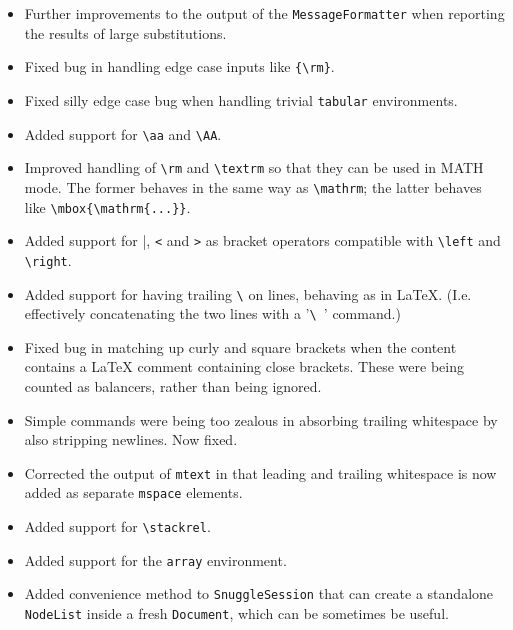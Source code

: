 \begin{itemize}

  \item Further improvements to the output of the \verb|MessageFormatter| when
  reporting the results of large substitutions.

  \item Fixed bug in handling edge case inputs like \verb|{\rm}|.

  \item Fixed silly edge case bug when handling trivial \verb|tabular|
  environments.

  \item Added support for \verb|\aa| and \verb|\AA|.

  \item Improved handling of \verb|\rm| and \verb|\textrm| so that they can be
  used in MATH mode. The former behaves in the same way as \verb|\mathrm|; the
  latter behaves like \verb|\mbox{\mathrm{...}}|.

  \item Added support for \verb|||, \verb|<| and \verb|>| as bracket operators
  compatible with \verb|\left| and \verb|\right|.

  \item Added support for having trailing \verb|\| on lines, behaving as in
  LaTeX.  (I.e. effectively concatenating the two lines with a '\verb|\ |'
  command.)

  \item Fixed bug in matching up curly and square brackets when the content
  contains a LaTeX comment containing close brackets. These were being counted
  as balancers, rather than being ignored.

  \item Simple commands were being too zealous in absorbing trailing whitespace
  by also stripping newlines. Now fixed.

  \item Corrected the output of \verb|mtext| in that leading and trailing
  whitespace is now added as separate \verb|mspace| elements.

  \item Added support for \verb|\stackrel|.

  \item Added support for the \verb|array| environment.

  \item Added convenience method to \verb|SnuggleSession| that can create a
  standalone \verb|NodeList| inside a fresh \verb|Document|, which can be
  sometimes be useful.


\end{itemize}
